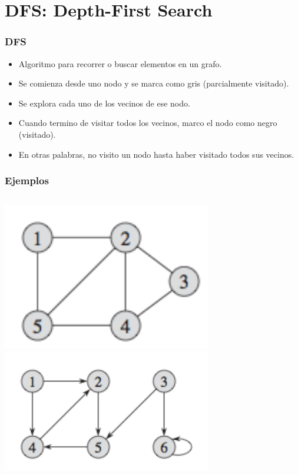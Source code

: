\documentclass{beamer}
\begin{document}
\section{DFS: Depth-First Search}
	\begin{frame}
		\frametitle{DFS}
		\begin{itemize}
			\item Algoritmo para recorrer o buscar elementos en un
grafo.
			\item Se comienza desde uno nodo y se marca como gris
(parcialmente visitado).
			\item Se explora cada uno de los vecinos de ese nodo.
			\item Cuando termino de visitar todos los vecinos, marco
el nodo como negro (visitado).
			\item En otras palabras, no visito un nodo hasta haber
visitado todos sus vecinos.
		\end{itemize}
	\end{frame}

	\begin{frame}
		\frametitle{Ejemplos}
		\begin{columns}
				\includegraphics[width =
1.05\textwidth]{GrafoND.png}
				\includegraphics[width =
1.10\textwidth]{GrafoD.png}
		\end{columns}
	\end{frame}
\end{document}
